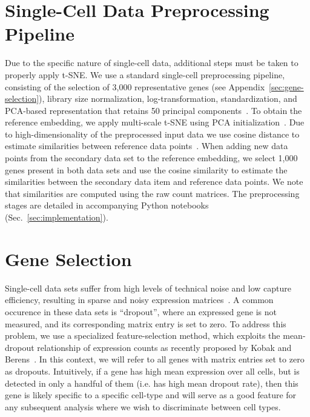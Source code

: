\documentclass[runningheads]{llncs}
\newcommand{\beginsupplement}{%
  \setcounter{table}{0}
  \renewcommand{\thetable}{S\arabic{table}}%
  \setcounter{figure}{0}
  \renewcommand{\thefigure}{S\arabic{figure}}%
}
\begin{document}
\newpage
\appendix
\beginsupplement

\section{Single-Cell Data Preprocessing Pipeline\label{sec:sc-pipeline}}

Due to the specific nature of single-cell data, additional steps must be taken
to properly apply t-SNE. We use a standard single-cell preprocessing pipeline,
consisting of the selection of 3,000 representative genes (see
Appendix~\ref{sec:gene-selection}), library size normalization,
log-transformation, standardization, and PCA-based representation that retains
50 principal components~\cite{Stuart2019,Wolf2018}. To obtain the reference
embedding, we apply multi-scale t-SNE using PCA initialization~\cite{Kobak2019}.
Due to high-dimensionality of the preprocessed input data we use cosine distance
to estimate similarities between reference data points~\cite{Domingos2012}. When
adding new data points from the secondary data set to the reference embedding,
we select 1,000 genes present in both data sets and use the cosine similarity to
estimate the similarities between the secondary data item and reference data
points. We note that similarities are computed using the raw count matrices. The
preprocessing stages are detailed in accompanying Python notebooks
(Sec.~\ref{sec:implementation}).

\section{Gene Selection\label{sec:gene-selection}}

Single-cell data sets suffer from high levels of technical noise and low capture
efficiency, resulting in sparse and noisy expression matrices~\cite{umi}. A
common occurence in these data sets is ``dropout'', where an expressed gene is
not measured, and its corresponding matrix entry is set to zero. To address this
problem, we use a specialized feature-selection method, which exploits the
mean-dropout relationship of expression counts as recently proposed by Kobak and
Berens~\cite{Kobak2019}. In this context, we will refer to all genes with matrix
entries set to zero as dropouts. Intuitively, if a gene has high mean expression
over all cells, but is detected in only a handful of them (i.e. has high mean
dropout rate), then this gene is likely specific to a specific cell-type and
will serve as a good feature for any subsequent analysis where we wish to
discriminate between cell types.
\end{document}
